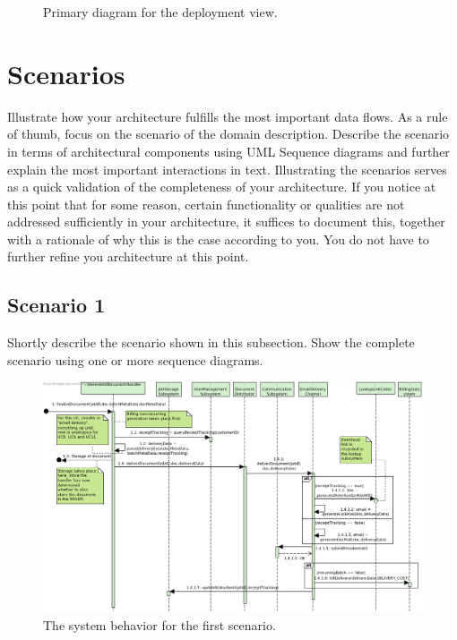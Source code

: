 \documentclass[a4paper,10pt]{article}
\begin{document}
\begin{figure}[!htp]
    \centering
    \caption{Primary diagram for the deployment view.}\label{fig:depl_primary}
\end{figure}

\section{Scenarios}\label{sec:scenarios}
Illustrate how your architecture fulfills the most important data flows.
As a rule of thumb, focus on the scenario of the domain description.
Describe the scenario in terms of architectural components using UML Sequence
diagrams and further explain the most important interactions in text.
Illustrating the scenarios serves as a quick validation of the completeness of
your architecture.
If you notice at this point that for some reason, certain functionality or
qualities are not addressed sufficiently in your architecture, it suffices to
document this, together with a rationale of why this is the case according to
you.
You do not have to further refine you architecture at this point.

\subsection{Scenario 1}
Shortly describe the scenario shown in this subsection.
Show the complete scenario using one or more sequence diagrams.

\begin{figure}[!htp]
    \centering
    \includegraphics[width=\textwidth]{figures/UC6 - Deliver document via e-mail.png}
    \caption{The system behavior for the first scenario.
        }\label{fig:seq_scenario1}
\end{figure}
\end{document}
